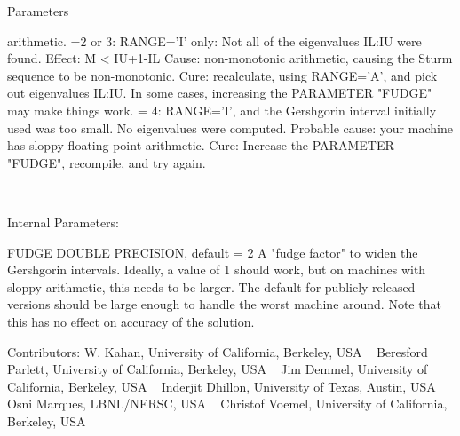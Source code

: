 \begin{DoxyParams}[1]{Parameters}
\begin{DoxyVerb}
                        arithmetic.
                =2 or 3: RANGE='I' only: Not all of the eigenvalues
                        IL:IU were found.
                        Effect: M < IU+1-IL
                        Cause:  non-monotonic arithmetic, causing the
                                Sturm sequence to be non-monotonic.
                        Cure:   recalculate, using RANGE='A', and pick
                                out eigenvalues IL:IU.  In some cases,
                                increasing the PARAMETER "FUDGE" may
                                make things work.
                = 4:    RANGE='I', and the Gershgorin interval
                        initially used was too small.  No eigenvalues
                        were computed.
                        Probable cause: your machine has sloppy
                                        floating-point arithmetic.
                        Cure: Increase the PARAMETER "FUDGE",
                              recompile, and try again.\end{DoxyVerb}
 \\
\hline
\end{DoxyParams}
\begin{DoxyParagraph}{Internal Parameters\+: }
\begin{DoxyVerb}  FUDGE   DOUBLE PRECISION, default = 2
          A "fudge factor" to widen the Gershgorin intervals.  Ideally,
          a value of 1 should work, but on machines with sloppy
          arithmetic, this needs to be larger.  The default for
          publicly released versions should be large enough to handle
          the worst machine around.  Note that this has no effect
          on accuracy of the solution.\end{DoxyVerb}

\end{DoxyParagraph}
\begin{DoxyParagraph}{Contributors\+: }
W. Kahan, University of California, Berkeley, U\+S\+A ~\newline
 Beresford Parlett, University of California, Berkeley, U\+S\+A ~\newline
 Jim Demmel, University of California, Berkeley, U\+S\+A ~\newline
 Inderjit Dhillon, University of Texas, Austin, U\+S\+A ~\newline
 Osni Marques, L\+B\+N\+L/\+N\+E\+R\+S\+C, U\+S\+A ~\newline
 Christof Voemel, University of California, Berkeley, U\+S\+A ~\newline
 
\end{DoxyParagraph}
